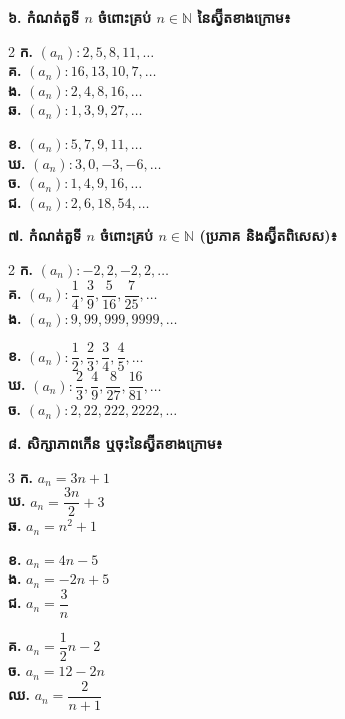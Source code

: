 \documentclass[11pt,a4paper]{article}
\begin{document}
\vspace{3pt}
\textbf{៦. កំណត់តួទី $n$ ចំពោះគ្រប់ $n \in \mathbb{N}$ នៃស្វ៊ីតខាងក្រោម៖}
\begin{multicols}{2}
\textbf{ក.} $(a_n): 2, 5, 8, 11, \dots$\\[6pt]
\textbf{គ.} $(a_n): 16, 13, 10, 7, \dots$\\[6pt]
\textbf{ង.} $(a_n): 2, 4, 8, 16, \dots$\\[6pt]
\textbf{ឆ.} $(a_n): 1, 3, 9, 27, \dots$

\columnbreak
\textbf{ខ.} $(a_n): 5, 7, 9, 11, \dots$\\[6pt]
\textbf{ឃ.} $(a_n): 3, 0, -3, -6, \dots$\\[6pt]
\textbf{ច.} $(a_n): 1, 4, 9, 16, \dots$\\[6pt]
\textbf{ជ.} $(a_n): 2, 6, 18, 54, \dots$
\end{multicols}

\vspace{3pt}
\textbf{៧. កំណត់តួទី $n$ ចំពោះគ្រប់ $n \in \mathbb{N}$ (ប្រភាគ និងស្វ៊ីតពិសេស)៖}
\begin{multicols}{2}
\textbf{ក.} $(a_n): -2, 2, -2, 2, \dots$\\[8pt]
\textbf{គ.} $(a_n): \dfrac{1}{4}, \dfrac{3}{9}, \dfrac{5}{16}, \dfrac{7}{25}, \dots$\\[8pt]
\textbf{ង.} $(a_n): 9, 99, 999, 9999, \dots$

\columnbreak
\textbf{ខ.} $(a_n): \dfrac{1}{2}, \dfrac{2}{3}, \dfrac{3}{4}, \dfrac{4}{5}, \dots$\\[8pt]
\textbf{ឃ.} $(a_n): \dfrac{2}{3}, \dfrac{4}{9}, \dfrac{8}{27}, \dfrac{16}{81}, \dots$\\[8pt]
\textbf{ច.} $(a_n): 2, 22, 222, 2222, \dots$
\end{multicols}

\vspace{3pt}
\textbf{៨. សិក្សាភាពកើន ឬចុះនៃស្វ៊ីតខាងក្រោម៖}
\begin{multicols}{3}
\textbf{ក.} $a_n = 3n + 1$\\[8pt]
\textbf{ឃ.} $a_n = \dfrac{3n}{2} + 3$\\[8pt]
\textbf{ឆ.} $a_n = n^2 + 1$

\columnbreak
\textbf{ខ.} $a_n = 4n - 5$\\[8pt]
\textbf{ង.} $a_n = -2n + 5$\\[8pt]
\textbf{ជ.} $a_n = \dfrac{3}{n}$

\columnbreak
\textbf{គ.} $a_n = \dfrac{1}{2}n - 2$\\[8pt]
\textbf{ច.} $a_n = 12 - 2n$\\[8pt]
\textbf{ឈ.} $a_n = \dfrac{2}{n+1}$
\end{multicols}
\end{document}
